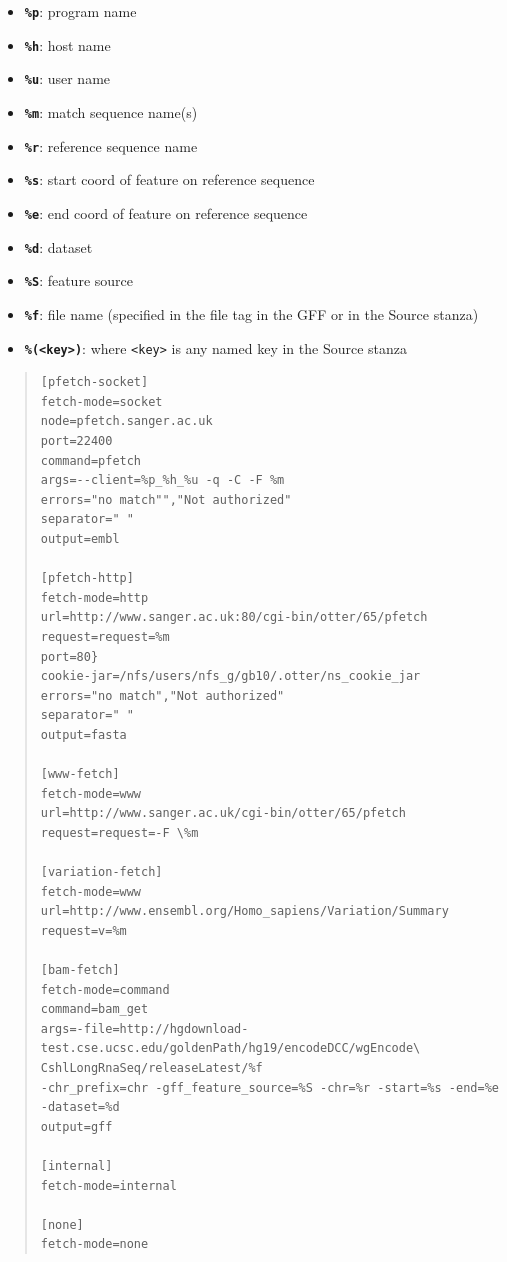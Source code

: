 \documentclass[letterpaper]{article}
\newcommand\liststyleLii{%
\renewcommand\labelitemi{{\textbullet}}
\renewcommand\labelitemii{{\textbullet}}
\renewcommand\labelitemiii{{\textbullet}}
\renewcommand\labelitemiv{{\textbullet}}
}
\begin{document}
\liststyleLii
\begin{itemize}
\item {
\texttt{\textbf{\%p}}: program name }
\end{itemize}
\liststyleLii
\begin{itemize}
\item {\texttt{\textbf{\%h}}: host name }
\item {\texttt{\textbf{\%u}}: user name }
\item {\texttt{\textbf{\%m}}: match sequence name(s) }
\item {\texttt{\textbf{\%r}}: reference sequence name }
\item {\texttt{\textbf{\%s}}: start coord of feature on reference sequence }
\item {\texttt{\textbf{\%e}}: end coord of feature on reference sequence }
\item {\texttt{\textbf{\%d}}: dataset }
\item {\texttt{\textbf{\%S}}: feature source }
\item {\texttt{\textbf{\%f}}: file name (specified in the file tag in the GFF or in the Source stanza) }
\item {\texttt{\textbf{\%(<key>)}}: where \texttt{<key>} is any named key in the Source stanza }


\bigskip
\end{itemize}

\begin{quote}
\begin{verbatim}
[pfetch-socket]
fetch-mode=socket
node=pfetch.sanger.ac.uk
port=22400
command=pfetch
args=--client=%p_%h_%u -q -C -F %m
errors="no match"","Not authorized"
separator=" "
output=embl

[pfetch-http]
fetch-mode=http
url=http://www.sanger.ac.uk:80/cgi-bin/otter/65/pfetch
request=request=%m
port=80}
cookie-jar=/nfs/users/nfs_g/gb10/.otter/ns_cookie_jar
errors="no match","Not authorized"
separator=" "
output=fasta

[www-fetch]
fetch-mode=www
url=http://www.sanger.ac.uk/cgi-bin/otter/65/pfetch
request=request=-F \%m

[variation-fetch]
fetch-mode=www
url=http://www.ensembl.org/Homo_sapiens/Variation/Summary
request=v=%m

[bam-fetch]
fetch-mode=command
command=bam_get
args=-file=http://hgdownload-test.cse.ucsc.edu/goldenPath/hg19/encodeDCC/wgEncode\
CshlLongRnaSeq/releaseLatest/%f
-chr_prefix=chr -gff_feature_source=%S -chr=%r -start=%s -end=%e
-dataset=%d
output=gff

[internal]
fetch-mode=internal

[none]
fetch-mode=none
\end{verbatim}
\end{quote}
\end{document}
